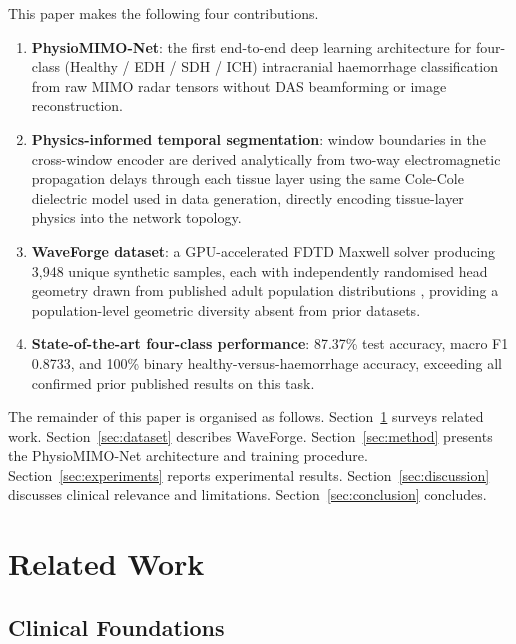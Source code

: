 \documentclass[journal]{IEEEtran}
\begin{document}
This paper makes the following four contributions.

\begin{enumerate}

\item \textbf{PhysioMIMO-Net}: the first end-to-end deep
learning architecture for four-class (Healthy / EDH / SDH /
ICH) intracranial haemorrhage classification from raw MIMO
radar tensors without DAS beamforming or image reconstruction.

\item \textbf{Physics-informed temporal segmentation}: window
boundaries in the cross-window encoder are derived
analytically from two-way electromagnetic propagation delays
through each tissue layer using the same Cole-Cole dielectric
model \cite{Gabriel1996} used in data generation, directly
encoding tissue-layer physics into the network topology.

\item \textbf{WaveForge dataset}: a GPU-accelerated FDTD
Maxwell solver \cite{Yee1966} producing 3{,}948 unique
synthetic samples, each with independently randomised head
geometry drawn from published adult population distributions
\cite{Lynnerup2005}, providing a population-level geometric
diversity absent from prior datasets.

\item \textbf{State-of-the-art four-class performance}: 87.37\%
test accuracy, macro F1 0.8733, and 100\% binary
healthy-versus-haemorrhage accuracy, exceeding all confirmed
prior published results on this task.

\end{enumerate}

The remainder of this paper is organised as follows.
Section~\ref{sec:related} surveys related work.
Section~\ref{sec:dataset} describes WaveForge.
Section~\ref{sec:method} presents the PhysioMIMO-Net
architecture and training procedure.
Section~\ref{sec:experiments} reports experimental results.
Section~\ref{sec:discussion} discusses clinical relevance and
limitations.  Section~\ref{sec:conclusion} concludes.


\section{Related Work}
\label{sec:related}

\subsection{Clinical Foundations}
\end{document}
